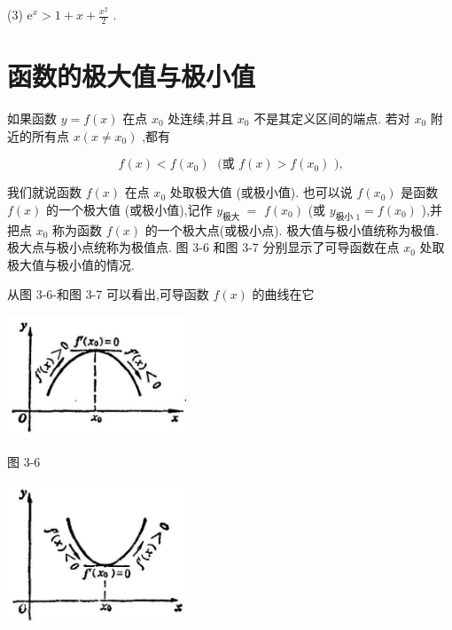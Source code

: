 \documentclass[lang=cn,newtx,10pt,scheme=chinese]{elegantbook}
\begin{document}
(3) \({\mathrm{e}}^{x} > 1 + x + \frac{{x}^{2}}{2}\) .

\section{函数的极大值与极小值}

如果函数 \(y = f\left( x\right)\) 在点 \({x}_{0}\) 处连续,并且 \({x}_{0}\) 不是其定义区间的端点. 若对 \({x}_{0}\) 附近的所有点 \(x\left( {x \neq {x}_{0}}\right)\) ,都有

\[
f\left( x\right) < f\left( {x}_{0}\right) \;\text{ (或 }f\left( x\right) > f\left( {x}_{0}\right) \text{ ),}
\]

我们就说函数 \(f\left( x\right)\) 在点 \({x}_{0}\) 处取极大值 (或极小值). 也可以说 \(f\left( {x}_{0}\right)\) 是函数 \(f\left( x\right)\) 的一个极大值 (或极小值),记作 \({y}_{\text{极大 }} =\) \(f\left( {x}_{0}\right)\) (或 \({y}_{\text{极小 }1} = f\left( {x}_{0}\right)\) ),并把点 \({x}_{0}\) 称为函数 \(f\left( x\right)\) 的一个极大点(或极小点). 极大值与极小值统称为极值. 极大点与极小点统称为极值点. 图 3-6 和图 3-7 分别显示了可导函数在点 \({x}_{0}\) 处取极大值与极小值的情况.

从图 3-6-和图 3-7 可以看出,可导函数 \(f\left( x\right)\) 的曲线在它

\begin{center}
\includegraphics[max width=0.4\textwidth]{images/01912c18-5c3f-733d-b775-749ba9897a9d_141_386711.jpg}
\end{center}

图 3-6

\begin{center}
\includegraphics[max width=0.4\textwidth]{images/01912c18-5c3f-733d-b775-749ba9897a9d_141_950727.jpg}
\end{center}
\end{document}

